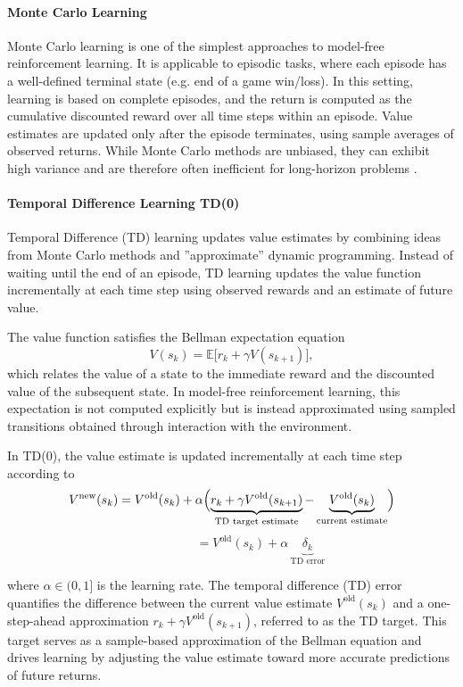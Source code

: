 \paragraph{Monte Carlo Learning}
Monte Carlo learning is one of the simplest approaches to model-free reinforcement learning. It is applicable to episodic tasks, where each episode has a well-defined terminal state (e.g. end of a game win/loss). In this setting, learning is based on complete episodes, and the return is computed as the cumulative discounted reward over all time steps within an episode. Value estimates are updated only after the episode terminates, using sample averages of observed returns. While Monte Carlo methods are unbiased, they can exhibit high variance and are therefore often inefficient for long-horizon problems \cite{brunton2022data}.

\paragraph{Temporal Difference Learning TD(0)}
Temporal Difference (TD) learning updates value estimates by combining ideas from Monte Carlo methods and ''approximate'' dynamic programming. Instead of waiting until the end of an episode, TD learning updates the value function incrementally at each time step using observed rewards and an estimate of future value.

The value function satisfies the Bellman expectation equation
\[
V(s_k) = \mathbb{E}\bigl[r_k + \gamma V(s_{k+1})\bigr],
\]
which relates the value of a state to the immediate reward and the discounted value of the subsequent state. In model-free reinforcement learning, this expectation is not computed explicitly but is instead approximated using sampled transitions obtained through interaction with the environment.

In TD(0), the value estimate is updated incrementally at each time step according to
\[
V^{\text{new}}(s_k)
= V^{\text{old}}(s_k)
+ \alpha \Bigl(
\underbrace{r_k + \gamma V^{\text{old}}(s_{k+1})}_{\text{TD target estimate}}
-
\underbrace{V^{\text{old}}(s_k)}_{\text{current estimate}}
\Bigr)
\]
\[
\qquad\qquad\;\; = V^{\text{old}}(s_k) + \alpha \,\underbrace{\delta_k}_{\text{TD error}}
\]

where \( \alpha \in (0,1] \) is the learning rate. The temporal difference (TD) error quantifies the difference between the current value estimate \( V^{\text{old}}(s_k) \) and a one-step-ahead approximation \( r_k + \gamma V^{\text{old}}(s_{k+1}) \), referred to as the TD target. This target serves as a sample-based approximation of the Bellman equation and drives learning by adjusting the value estimate toward more accurate predictions of future returns.


